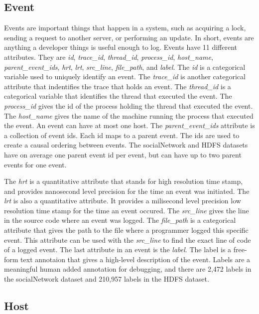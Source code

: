 \documentclass{article}
\begin{document}
\subsection{Event}

Events are important things that happen in a system, such as acquiring a lock, sending a request to another server,
or performing an update. In short, events are anything a developer things is useful enough to log. Events have 11
different attributes. They are \textit{id}, \textit{trace\_id}, \textit{thread\_id}, \textit{process\_id}, \textit{host\_name},
\textit{parent\_event\_ids}, \textit{hrt}, \textit{lrt}, \textit{src\_line}, \textit{file\_path}, and \textit{label}. The
\textit{id} is a categorical variable used to uniquely identify an event. The \textit{trace\_id} is another categorical
attribute that indentifies the trace that holds an event. The \textit{thread\_id} is a categorical variable that identifies the
thread that executed the event. The \textit{process\_id} gives the id of the process holding the thread that executed the event.
The \textit{host\_name} gives the name of the machine running the process that executed the event. An event can have at most one
host. The \textit{parent\_event\_ids} attribute is a collection of event ids. Each id maps to a parent event. The ids are used to
create a causal ordering between events. The socialNetwork and HDFS datasets have on average one parent event id per event, but 
can have up to two parent events for one event. 

The \textit{hrt} is a quantitative attribute that stands for high resolution time
stamp, and provides nanosecond level precision for the time an event was initiated. The \textit{lrt} is also a quantitative attribute.
It provides a milisecond level precision low resolution time stamp for the time an event occured. The \textit{src\_line} gives the line
in the source code where an event was logged. The \textit{file\_path} is a categorical attribute that gives the path to the file where 
a programmer logged this specific event. This attribute can be used with the \textit{src\_line} to find the exact line of code of a logged event.
The last attribute in an event is the \textit{label}. The label is a free-form text annotaion that gives a high-level description of the
event. Labels are a meaningful human added annotation for debugging, and there are 2,472 labels in the socialNetwork dataset and 210,957 labels
in the HDFS dataset.

\subsection{Host}
\end{document}
